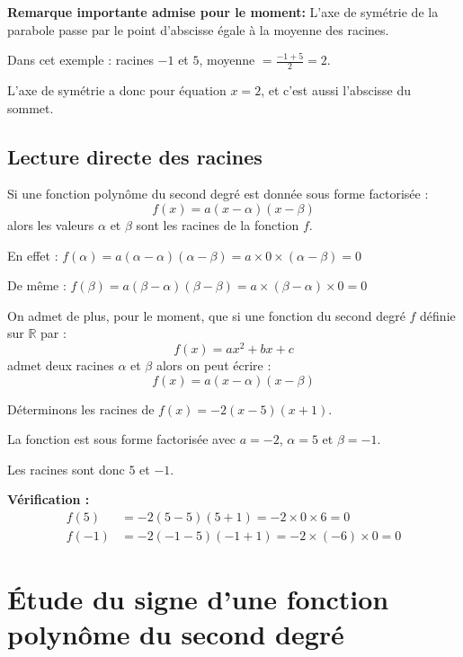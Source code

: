\documentclass[11pt,a4paper]{article}
\begin{document}
	\begin{attention}
		\textbf{Remarque importante admise pour le moment:} L'axe de symétrie de la parabole passe par le point d'abscisse égale à la moyenne des racines.
		
		Dans cet exemple : racines $-1$ et $5$, moyenne $= \frac{-1 + 5}{2} = 2$.
		
		L'axe de symétrie a donc pour équation $x = 2$, et c'est aussi l'abscisse du sommet.
	\end{attention}
	
	\subsection{Lecture directe des racines}
	
	\begin{propriete}
		Si une fonction polynôme du second degré est donnée sous forme factorisée :
		$$f(x) = a(x - \alpha)(x - \beta)$$
		alors les valeurs $\alpha$ et $\beta$ sont les racines de la fonction $f$.
		
		En effet : $f(\alpha) = a(\alpha - \alpha)(\alpha - \beta) = a \times 0 \times (\alpha - \beta) = 0$
		
		De même : $f(\beta) = a(\beta - \alpha)(\beta - \beta) = a \times (\beta - \alpha) \times 0 = 0$
		
		On admet de plus, pour le moment, que si une fonction du second degré $f$ définie sur $\mathbb{R}$ par :
		$$f(x) = ax^2 + bx + c$$
		admet deux racines $\alpha$ et $\beta$ alors on peut écrire :
		$$f(x) = a(x - \alpha)(x - \beta)$$
		
		
	\end{propriete}
	
	\begin{exemple}
		Déterminons les racines de $f(x) = -2(x - 5)(x + 1)$.
		
		La fonction est sous forme factorisée avec $a = -2$, $\alpha = 5$ et $\beta = -1$.
		
		Les racines sont donc $5$ et $-1$.
		
		\textbf{Vérification :}
		\begin{align*}
			f(5) &= -2(5 - 5)(5 + 1) = -2 \times 0 \times 6 = 0 \\
			f(-1) &= -2(-1 - 5)(-1 + 1) = -2 \times (-6) \times 0 = 0
		\end{align*}
	\end{exemple}
	
	\section{Étude du signe d'une fonction polynôme du second degré}
	
\end{document}
